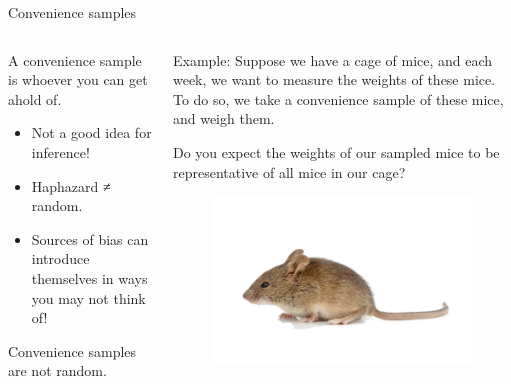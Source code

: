 \documentclass[aspectratio=169]{../latex_main/tntbeamer}  %
\begin{document}
	\begin{frame}{Convenience samples}
	    \begin{columns}
	        \begin{column}{.4\textwidth}
	             A convenience sample is whoever you can get ahold of.
	             \begin{itemize}
	                 \item Not a good idea for inference!
	                 \item Haphazard ≠ random.
	                 \item Sources of bias can introduce themselves in ways you may not think of!
	             \end{itemize}
	                \bigskip
	                Convenience samples are not random.
	        \end{column}
	        \begin{column}{.4\textwidth}
	                Example: Suppose we have a cage of mice, and each week, we want to measure the weights of these mice. To do so, we take a convenience sample of these mice, and weigh them.
	                
	                \bigskip
	                Do you expect the weights of our sampled mice to be representative of all mice in our cage?
	                
	                \begin{figure}
	                    \centering
	                    \includegraphics[scale=.4]{Bild9}
	                \end{figure}
	        \end{column}
	    \end{columns}
	\end{frame}
	
\end{document}
